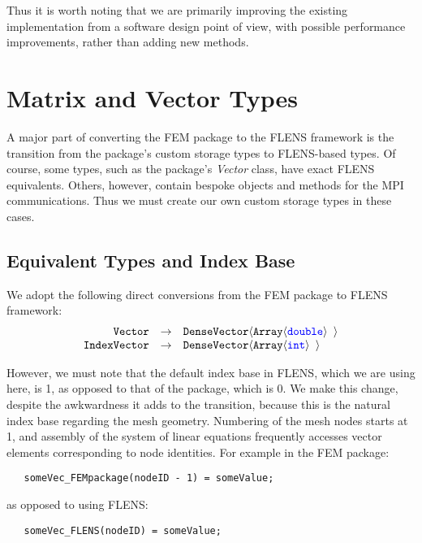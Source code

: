 Thus it is worth noting that we are primarily improving the existing implementation from a software design point of view, with possible performance improvements, rather than adding new methods.

\section{Matrix and Vector Types}

A major part of converting the FEM package to the FLENS framework is the transition from the package's custom storage types to FLENS-based types. Of course, some types, such as the package's \emph{Vector} class, have exact FLENS equivalents. Others, however, contain bespoke objects and methods for the MPI communications. Thus we must create our own custom storage types in these cases.

\subsection{Equivalent Types and Index Base}

We adopt the following direct conversions from the FEM package to FLENS framework:
\begin{equation*}
\begin{array}{rcl}
   \mbox{\texttt{Vector}}  &  \rightarrow  &  \mbox{\texttt{DenseVector$\langle$Array$\langle${\color{blue}double}$\rangle$ $\rangle$}} \\
   \mbox{\texttt{IndexVector}} & \rightarrow & \mbox{\texttt{DenseVector$\langle$Array$\langle${\color{blue}int}$\rangle$ $\rangle$}}
\end{array}
\end{equation*}

However, we must note that the default index base in FLENS, which we are using here, is 1, as opposed to that of the package, which is 0. We make this change, despite the awkwardness it adds to the transition, because this is the natural index base regarding the mesh geometry. Numbering of the mesh nodes starts at 1, and assembly of the system of linear equations frequently accesses vector elements corresponding to node identities. For example in the FEM package:

\begin{lstlisting}
   someVec_FEMpackage(nodeID - 1) = someValue;
\end{lstlisting}

as opposed to using FLENS:

\begin{lstlisting}
   someVec_FLENS(nodeID) = someValue;
\end{lstlisting}

